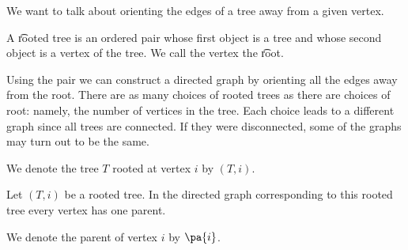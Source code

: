 
\sbasic







\sstart
{}


We want to talk about orienting the edges of a tree away from a given vertex.


A \t{rooted tree} is an ordered pair whose first object is a tree and whose second object is a vertex of the tree. We call the vertex the \t{root}.

Using the pair we can construct a directed graph by orienting all the edges away from the root.
There are as many choices of rooted trees as there are choices of root: namely, the number of vertices in the tree.
Each choice leads to a different graph since all trees are connected.
If they were disconnected, some of the graphs may turn out to be the same.


We denote the tree $T$ rooted at vertex $i$ by $(T, i)$.


\begin{prop}
Let $(T, i)$ be a rooted tree.
In the directed graph corresponding to this rooted tree every vertex has one parent.
\end{prop}

We denote the parent of vertex $i$ by $\pa{i}$.
\strats
